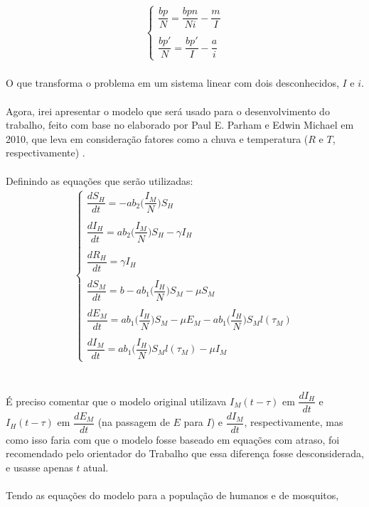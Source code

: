 \begin{gather*}
\begin{cases}
\dfrac{bp}{N} = \dfrac{bpn}{Ni} -\dfrac{m}{I} \\
\\
\dfrac{bp'}{N} = \dfrac{bp'}{I} -\dfrac{a}{i} 
\end{cases}
\end{gather*}
\\
O que transforma o problema em um sistema linear com dois desconhecidos, 
$I$ e $i$.
\\\\
Agora, irei apresentar o modelo que será usado para o desenvolvimento do 
trabalho, feito com base no elaborado por Paul E. Parham e Edwin Michael 
em 2010, que leva em consideração fatores como a chuva e temperatura 
($R$ e $T$, respectivamente) \cite{Parham2010}. 
\\\\
Definindo as equações que serão utilizadas:
\begin{gather*}
\begin{cases}
\dfrac{dS_H}{dt} = -ab_2\bigg(\dfrac{I_M}{N}\bigg)S_H\\
\\
\dfrac{dI_H}{dt} = ab_2\bigg(\dfrac{I_M}{N}\bigg)S_H-\gamma I_H\\
\\
\dfrac{dR_H}{dt} = \gamma I_H\\
\\
\dfrac{dS_M}{dt} = b - ab_1\bigg(\dfrac{I_H}{N}\bigg)S_M - \mu S_M\\
\\
\dfrac{dE_M}{dt} = ab_1\bigg(\dfrac{I_H}{N}\bigg)S_M - \mu E_M - ab_1\bigg(\dfrac{I_H}{N}\bigg)S_Ml(\tau_M)\\
\\
\dfrac{dI_M}{dt} = ab_1\bigg(\dfrac{I_H}{N}\bigg)S_Ml(\tau_M) -\mu I_M
\end{cases}
\end{gather*}
\\\\
É preciso comentar que o modelo original utilizava $I_M(t-\tau)$ em 
$\dfrac{dI_H}{dt}$ e $I_H(t-\tau)$ em $\dfrac{dE_M}{dt}$ (na passagem 
de $E$ para $I$) e $\dfrac{dI_M}{dt}$, respectivamente, mas como isso 
faria com que o modelo fosse baseado em equações com atraso, foi 
recomendado pelo orientador do Trabalho que essa diferença fosse 
desconsiderada, e usasse apenas $t$ atual.
\\\\
Tendo as equações do modelo para a população de humanos e de mosquitos, 
